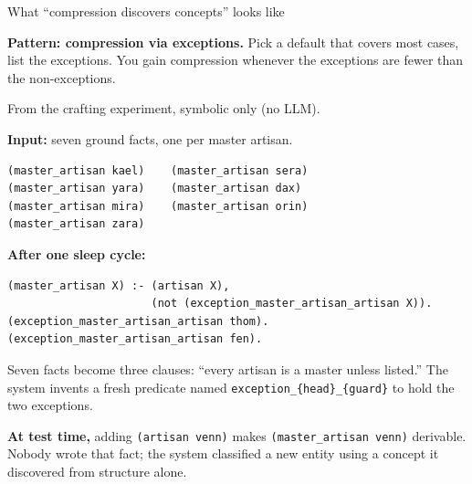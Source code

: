 \documentclass[10pt,aspectratio=169]{beamer}
\begin{document}
\begin{frame}[fragile]{What ``compression discovers concepts'' looks like}

  \textbf{Pattern: compression via exceptions.} Pick a default that
  covers most cases, list the exceptions. You gain compression
  whenever the exceptions are fewer than the non-exceptions.

  From the crafting experiment, symbolic only (no LLM).

  \textbf{Input:} seven ground facts, one per master artisan.
\begin{lstlisting}
(master_artisan kael)    (master_artisan sera)
(master_artisan yara)    (master_artisan dax)
(master_artisan mira)    (master_artisan orin)
(master_artisan zara)
\end{lstlisting}

  \textbf{After one sleep cycle:}
\begin{lstlisting}
(master_artisan X) :- (artisan X),
                      (not (exception_master_artisan_artisan X)).
(exception_master_artisan_artisan thom).
(exception_master_artisan_artisan fen).
\end{lstlisting}

  Seven facts become three clauses: ``every artisan is a master
  unless listed.'' The system invents a fresh predicate named
  \texttt{exception\_\{head\}\_\{guard\}} to hold the two exceptions.

  \textbf{At test time,} adding \texttt{(artisan venn)} makes
  \texttt{(master\_artisan venn)} derivable. Nobody wrote that fact;
  the system classified a new entity using a concept it discovered
  from structure alone.

\end{frame}
\end{document}
